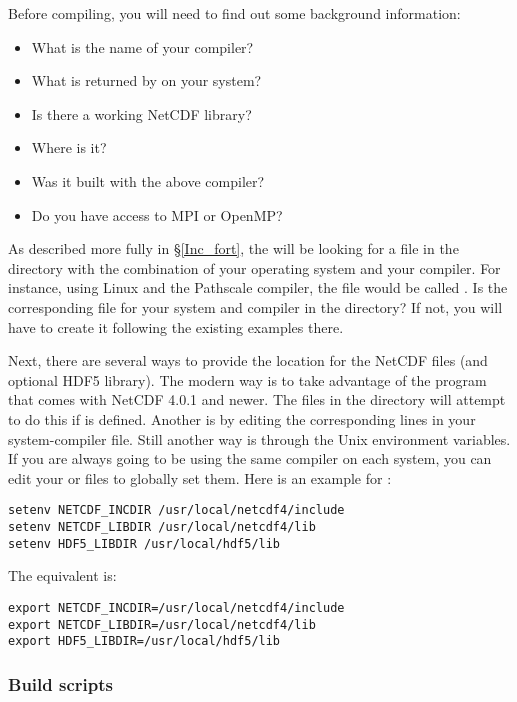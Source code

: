 Before compiling, you will need to find out some background information:
\begin{itemize}
 \item What is the name of your compiler?
 \item What is returned by  on your system?
 \item Is there a working NetCDF library?
 \item Where is it?
 \item Was it built with the above compiler?
 \item Do you have access to MPI or OpenMP?
\end{itemize}
As described more fully in \S\ref{Inc_fort}, the  will be
looking for a file in the  directory with the
combination of your operating system and your compiler. For
instance, using Linux and the Pathscale compiler, the file would be
called . Is the corresponding file for your
system and compiler in the  directory? If not, you
will have to create it following the existing examples there.

Next, there are several ways to provide the location for the NetCDF
files (and optional HDF5 library). The modern way is to take
advantage of the  program that comes with NetCDF 4.0.1
and newer. The files in the  directory will attempt
to do this if  is defined. Another is by editing the
corresponding lines in your system-compiler file. Still another way is
through the Unix environment variables. If you are always going to be
using the same compiler on each system, you can edit your 
or  files to globally set them. Here is an example for
:
\begin{verbatim}
setenv NETCDF_INCDIR /usr/local/netcdf4/include
setenv NETCDF_LIBDIR /usr/local/netcdf4/lib
setenv HDF5_LIBDIR /usr/local/hdf5/lib
\end{verbatim}
The  equivalent is:
\begin{verbatim}
export NETCDF_INCDIR=/usr/local/netcdf4/include
export NETCDF_LIBDIR=/usr/local/netcdf4/lib
export HDF5_LIBDIR=/usr/local/hdf5/lib
\end{verbatim}

\subsubsection{Build scripts}

